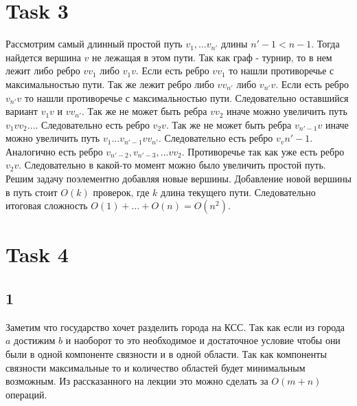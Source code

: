 \documentclass[12pt]{exam}
\begin{document}
\section*{Task 3}
Рассмотрим самый длинный простой путь $v_1, \ldots v_{n'}$ 
длины $n' - 1 < n - 1$.
Тогда найдется вершина $v$ не лежащая в этом пути.
Так как граф - турнир, то в нем лежит 
либо ребро $vv_1$ либо $v_1v$. 
Если есть ребро $vv_1$ то нашли противоречье с максимальностью пути.
Так же лежит ребро либо $vv_{n'}$ либо $v_{n'}v$.
Если есть ребро $v_{n'}v$ то нашли противоречье с максимальностью пути.
Следовательно оставшийся вариант $v_1v$ и $vv_{n'}$. 
Так же не может быть ребра $vv_2$ иначе можно увеличить путь 
$v_1 v v_2 \ldots$. Следовательно есть ребро $v_2v$.
Так же не может быть ребра $v_{n'-1}v$ иначе можно увеличить путь
$v_1 \ldots v_{n'-1}v v_{n'}$. Следовательно есть ребро $v_v{n'-1}$.
Аналогично есть ребро $v_{n'-2}, v_{n'-3}, \ldots vv_2$.
Противоречье так как уже есть ребро $v_2v$. 
Следовательно в какой-то момент можно было увеличить простой путь.\\
Решим задачу поэлементно добавляя новые вершины. 
Добавление новой вершины в путь стоит $O(k)$ проверок, где $k$ длина текущего пути.
Следовательно итоговая сложность $O(1) + \ldots + O(n) = O(n^2)$.
 
\section*{Task 4}
\subsection*{1}
Заметим что государство хочет разделить города на КСС. 
Так как если из города $a$ достижим $b$ и наоборот то это 
необходимое и достаточное условие чтобы они были в одной компоненте связности 
и в одной области. 
Так как компоненты связности максимальные то и 
количество областей будет минимальным возможным.
Из рассказанного на лекции это можно сделать за $O(m + n)$ операций.
\end{document}
